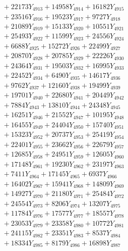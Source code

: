 \documentclass[a4paper,10pt]{article}
\begin{document}
{\begin{align}
&\;  + 22173 Y_{4913} + 14958 Y_{4914} + 16182 Y_{4915} \\[0.3ex]
&\;  + 23516 Y_{4916} + 19523 Y_{4917} + 9727 Y_{4918} \\[0.5ex]\allowbreak
&\;  + 21089 Y_{4919} + 15133 Y_{4920} + 10551 Y_{4921} \\[0.3ex]
&\;  + 25493 Y_{4922} + 11599 Y_{4923} + 24556 Y_{4924} \\[0.3ex]
&\;  + 6688 Y_{4925} + 15272 Y_{4926} + 22499 Y_{4927} \\[0.3ex]
&\;  + 20870 Y_{4928} + 20785 Y_{4929} + 22226 Y_{4930} \\[0.3ex]
&\;  + 24364 Y_{4931} + 19503 Y_{4932} + 16995 Y_{4933} \\[0.3ex]
&\;  + 22452 Y_{4934} + 6490 Y_{4935} + 14617 Y_{4936} \\[0.3ex]
&\;  + 9762 Y_{4937} + 12160 Y_{4938} + 19499 Y_{4939} \\[0.3ex]
&\;  + 19701 Y_{4940} + 22680 Y_{4941} + 20449 Y_{4942} \\[0.3ex]
&\;  + 7884 Y_{4943} + 13810 Y_{4944} + 24348 Y_{4945} \\[0.3ex]
&\;  + 16251 Y_{4946} + 21552 Y_{4947} + 10195 Y_{4948} \\[0.5ex]\allowbreak
&\;  + 16455 Y_{4949} + 24404 Y_{4950} + 15740 Y_{4951} \\[0.3ex]
&\;  + 15323 Y_{4952} + 20737 Y_{4953} + 25419 Y_{4954} \\[0.3ex]
&\;  + 22401 Y_{4955} + 23662 Y_{4956} + 22679 Y_{4957} \\[0.3ex]
&\;  + 12685 Y_{4958} + 24951 Y_{4959} + 12605 Y_{4960} \\[0.3ex]
&\;  + 17148 Y_{4961} + 19230 Y_{4962} + 23197 Y_{4963} \\[0.3ex]
&\;  + 7411 Y_{4964} + 17145 Y_{4965} + 6937 Y_{4966} \\[0.3ex]
&\;  + 16402 Y_{4967} + 15941 Y_{4968} + 14809 Y_{4969} \\[0.3ex]
&\;  + 14927 Y_{4970} + 21180 Y_{4971} + 25484 Y_{4972} \\[0.3ex]
&\;  + 24554 Y_{4973} + 8206 Y_{4974} + 13207 Y_{4975} \\[0.3ex]
&\;  + 11784 Y_{4976} + 17577 Y_{4977} + 18557 Y_{4978} \\[0.5ex]\allowbreak
&\;  + 23053 Y_{4979} + 23358 Y_{4980} + 10772 Y_{4981} \\[0.3ex]
&\;  + 24115 Y_{4982} + 23351 Y_{4983} + 8537 Y_{4984} \\[0.3ex]
&\;  + 18334 Y_{4985} + 8179 Y_{4986} + 16898 Y_{4987} \\[0.3ex]

\end{align}}
\end{document}
